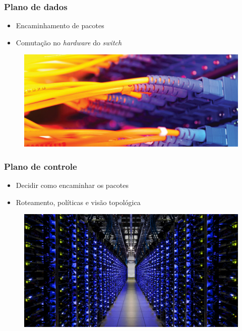 %
%
\begin{frame}\frametitle{Plano de dados}

    \begin{itemize}
    \item Encaminhamento de pacotes
    \item Comutação no \emph{hardware} do \emph{switch}
    \end{itemize}
        \begin{figure}[h]
        \centering
        \includegraphics[scale=2.0]{images/data-plane.png}
    \end{figure}
\end{frame}


%
%
\begin{frame}\frametitle{Plano de controle}

    \begin{itemize}
    \item Decidir como encaminhar os pacotes
    \item Roteamento, políticas e visão topológica
    \end{itemize}
        \begin{figure}[h]
        \centering
        \includegraphics[scale=0.13]{images/control-plane.png}
    \end{figure}
\end{frame}




